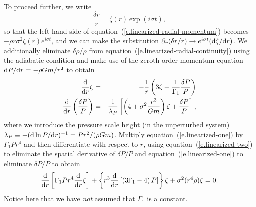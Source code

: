 To proceed further, we write
\[ \frac{\delta r}{r} = \zeta(r) \exp(i\sigma t), \]
so that the left-hand side of equation~(\ref{e.linearized-radial-momentum}) becomes $-\rho r \sigma^{2}\zeta(r) e^{i\sigma t}$, and we can make the substitution $\partial_{r} (\delta r/r) \to e^{i\sigma t}(\mathrm{d} \zeta/\mathrm{d} r)$.  We additionally eliminate $\delta \rho/\rho$ from equation~(\ref{e.linearized-radial-continuity}) using the adiabatic condition and make use of the zeroth-order momentum equation $\mathrm{d} P/\mathrm{d} r = -\rho Gm/r^{2}$ to obtain
\begin{eqnarray}
\label{e.linearized-one}
\frac{\mathrm{d}}{\mathrm{d} r}\zeta &=& -\frac{1}{r}\left(3\zeta + \frac{1}{\Gamma_{1}}\frac{\delta P}{P}\right)\\
\label{e.linearized-two}
\frac{\mathrm{d}}{\mathrm{d} r}\left(\frac{\delta P}{P}\right) &=& \frac{1}{\lambda_{P}}\left[\left( 4+ \sigma^{2}\frac{r^{3}}{Gm}\right)\zeta + \frac{\delta P}{P}\right],
\end{eqnarray}
where we introduce the pressure scale height (in the unperturbed system) $\lambda_{P} \equiv -(\mathrm{d} \ln P/\mathrm{d} r)^{-1} = P r^{2}/(\rho Gm)$.  Multiply equation~(\ref{e.linearized-one}) by $\Gamma_{1} P r^{4}$ and then differentiate with respect to $r$, using equation~(\ref{e.linearized-two}) to eliminate the spatial derivative of $\delta P/P$ and equation~(\ref{e.linearized-one}) to eliminate $\delta P/P$ to obtain
\begin{equation}\label{e.LAWE}
\frac{\mathrm{d}}{\mathrm{d} r}\left[ \Gamma_{1}P r^{4} \frac{\mathrm{d}}{\mathrm{d} r}\zeta\right] + \left\{ r^{3}\frac{\mathrm{d}}{\mathrm{d} r}\left[\left( 3\Gamma_{1}-4\right)P\right]\right\} \zeta + \sigma^{2} (r^{4}\rho) \zeta = 0.
\end{equation}
Notice here that we have \emph{not} assumed that $\Gamma_{1}$ is a constant.

